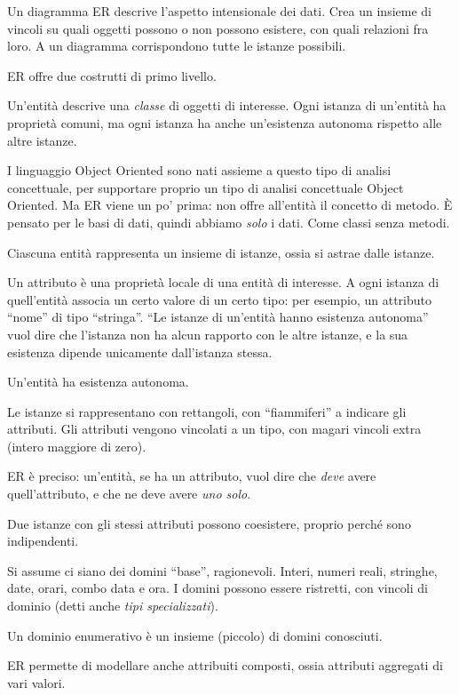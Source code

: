Un diagramma ER descrive l'aspetto intensionale dei dati. Crea un insieme di vincoli su quali oggetti possono o non possono esistere, con quali relazioni fra loro. A un diagramma corrispondono tutte le istanze possibili.

ER offre due costrutti di primo livello.

Un'entit\`a descrive una \emph{classe} di oggetti di interesse. Ogni istanza di un'entit\`a ha propriet\`a comuni, ma ogni istanza ha anche un'esistenza autonoma rispetto alle altre istanze.

I linguaggio Object Oriented sono nati assieme a questo tipo di analisi concettuale, per supportare proprio un tipo di analisi concettuale Object Oriented. Ma ER viene un po' prima: non offre all'entit\`a il concetto di metodo. \`E pensato per le basi di dati, quindi abbiamo \emph{solo} i dati. Come classi senza metodi.

Ciascuna entit\`a rappresenta un insieme di istanze, ossia si astrae dalle istanze.

Un attributo \`e una propriet\`a locale di una entit\`a di interesse. A ogni istanza di quell'entit\`a associa un certo valore di un certo tipo: per esempio, un attributo ``nome'' di tipo ``stringa''. ``Le istanze di un'entit\`a hanno esistenza autonoma'' vuol dire che l'istanza non ha alcun rapporto con le altre istanze, e la sua esistenza dipende unicamente dall'istanza stessa.

Un'entit\`a ha esistenza autonoma.

Le istanze si rappresentano con rettangoli, con ``fiammiferi'' a indicare gli attributi. Gli attributi vengono vincolati a un tipo, con magari vincoli extra (intero maggiore di zero).

ER \`e preciso: un'entit\`a, se ha un attributo, vuol dire che \emph{deve} avere quell'attributo, e che ne deve avere \emph{uno solo}.

Due istanze con gli stessi attributi possono coesistere, proprio perch\'e sono indipendenti.

Si assume ci siano dei domini ``base'', ragionevoli. Interi, numeri reali, stringhe, date, orari, combo data e ora. I domini possono essere ristretti, con vincoli di dominio (detti anche \emph{tipi specializzati}). 

Un dominio enumerativo \`e un insieme (piccolo) di domini conosciuti.

ER permette di modellare anche attribuiti composti, ossia attributi aggregati di vari valori.

